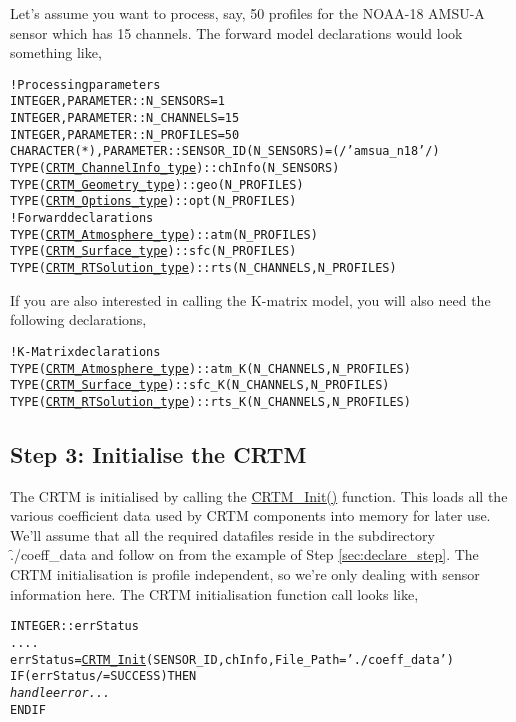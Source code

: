 Let's assume you want to process, say, 50 profiles for the NOAA-18 AMSU-A sensor which has 15 channels. The forward model declarations would look something like,
\begin{alltt}
  ! Processing parameters
  INTEGER     , PARAMETER :: N_SENSORS  =  1
  INTEGER     , PARAMETER :: N_CHANNELS = 15
  INTEGER     , PARAMETER :: N_PROFILES = 50
  CHARACTER(*), PARAMETER :: SENSOR_ID(N_SENSORS) = (/'amsua_n18'/)
  TYPE(\hyperref[fig:CRTM_ChannelInfo_type_structure]{CRTM_ChannelInfo_type})  :: chInfo(N_SENSORS)  
  TYPE(\hyperref[fig:CRTM_Geometry_type_structure]{CRTM_Geometry_type})     :: geo(N_PROFILES)  
  TYPE(\hyperref[fig:CRTM_Options_type_structure]{CRTM_Options_type})      :: opt(N_PROFILES)  
  ! Forward declarations
  TYPE(\hyperref[fig:CRTM_Atmosphere_type_structure]{CRTM_Atmosphere_type})   :: atm(N_PROFILES)
  TYPE(\hyperref[fig:CRTM_Surface_type_structure]{CRTM_Surface_type})      :: sfc(N_PROFILES)
  TYPE(\hyperref[fig:CRTM_RTSolution_type_structure]{CRTM_RTSolution_type})   :: rts(N_CHANNELS,N_PROFILES)\end{alltt}
If you are also interested in calling the K-matrix model, you will also need the following declarations,
\begin{alltt}
  ! K-Matrix declarations
  TYPE(\hyperref[fig:CRTM_Atmosphere_type_structure]{CRTM_Atmosphere_type})   :: atm_K(N_CHANNELS,N_PROFILES)
  TYPE(\hyperref[fig:CRTM_Surface_type_structure]{CRTM_Surface_type})      :: sfc_K(N_CHANNELS,N_PROFILES)
  TYPE(\hyperref[fig:CRTM_RTSolution_type_structure]{CRTM_RTSolution_type})   :: rts_K(N_CHANNELS,N_PROFILES)\end{alltt}


\subsection{Step 3: Initialise the CRTM}
\label{sec:init_step}
The CRTM is initialised by calling the \hyperref[sec:CRTM_Init_interface]{\f{CRTM\_Init()}} function. This loads all the various coefficient data used by CRTM components into memory for later use. We'll assume that all the required datafiles reside in the subdirectory \f{./coeff\_data} and follow on from the example of Step \ref{sec:declare_step}. The CRTM initialisation is profile independent, so we're only dealing with sensor information here. The CRTM initialisation function call looks like,
\begin{alltt}
  INTEGER :: errStatus
  ....
  errStatus = \hyperref[sec:CRTM_Init_interface]{CRTM_Init}( SENSOR_ID, chInfo, File_Path='./coeff_data' )
  IF ( errStatus /= SUCCESS ) THEN 
    \textrm{\textit{handle error...}}
  END IF\end{alltt}

